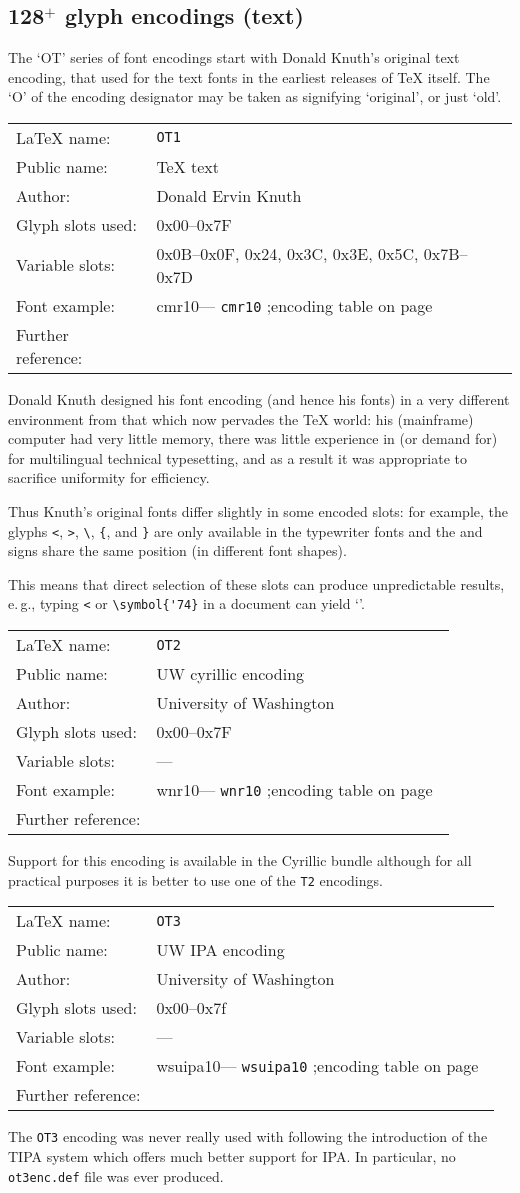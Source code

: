\documentclass{ltxguide}[1994/11/20]
\makeatletter
\providecommand{\Enc}[1]{\texttt{#1}}
\providecommand{\File}[1]{%
  \texttt{#1}}
\newenvironment{encodinginfo}[7]%
  {\noindent
   \begin{tabularx}{\linewidth}{@{}l>{\raggedright\let\\\tabularnewline}X}%
     \LaTeX{} name:          & \texttt{#1}\\%
     Public name:          & #2\\%
     Author:                   & #3\\%
     Glyph slots used: & #4\\%
     Variable slots:     & #5\\%
     Font example:     & \def\@tempa{#6}\ifx\@tempa\@empty---%
                            \else\texttt{#6}\referenceftable{#6}\fi\\%
     Further reference:                & #7%
   \end{tabularx}%
   \par\nobreak
   \vspace*{3pt}%
   \quote
  }%
  {\endquote
   \vspace{6pt}}
\def\referenceftable#1{
  \@ifundefined{r@fonttable:#1}%
  \relax
  {;\space encoding table on page~\pageref{fonttable:#1}}%
}
\makeatother
\begin{document}
\subsection{128$^+$ glyph encodings (text)}

The `OT' series of font encodings start with Donald Knuth's original
text encoding, that used for the text fonts in the earliest releases
of \TeX{} itself.  The `O' of the encoding designator may be taken as
signifying `original', or just `old'.

\begin{encodinginfo}{OT1}
        {\TeX{} text}
        {Donald Ervin Knuth}
        {0x00--0x7F}
        {0x0B--0x0F, 0x24, 0x3C, 0x3E, 0x5C, 0x7B--0x7D}
        {cmr10}
        {\cite[p.427]{A-W:DKn86}}

  Donald Knuth designed his font encoding (and hence his fonts) in a
  very different environment from that which now pervades the \TeX{}
  world: his (mainframe) computer had very little memory, there was
  little experience in (or demand for) for multilingual technical
  typesetting, and as a result it was appropriate to sacrifice
  uniformity for efficiency.

  Thus Knuth's original fonts differ slightly in some encoded slots:
  for example, the glyphs \texttt{\string<}, \texttt{\string>},
  \verb=\=, \verb={=, and \verb=}= are only available in the
  typewriter fonts and the \textdollar{} and \textsterling{} signs
  share the same position (in different font shapes).

  This means that direct selection of these slots can produce
  unpredictable results, e.\,g., typing \texttt{\string<} or
  \verb=\symbol{'74}= in a document can yield `\textquestiondown'.
\end{encodinginfo}


\begin{encodinginfo}{OT2}
        {UW cyrillic encoding}
        {University of Washington}
        {0x00--0x7F}
        {---}
        {wnr10}
        {\cite{Beeton:TB6-3-124}}
  Support for this encoding is available in the Cyrillic bundle although for
  all practical purposes it is better to use one of the \Enc{T2} encodings.
\end{encodinginfo}


\begin{encodinginfo}{OT3}
        {UW IPA encoding}
        {University of Washington}
        {0x00--0x7f}
        {---}
        {wsuipa10}
        {\cite[p.149]{CorkGW:91}}
  The \Enc{OT3} encoding was never really used with \LaTeXe{}
  following the introduction of the TIPA system which offers much
  better support for IPA. In particular, no \File{ot3enc.def}
  file was ever produced.
\end{encodinginfo}
\end{document}
